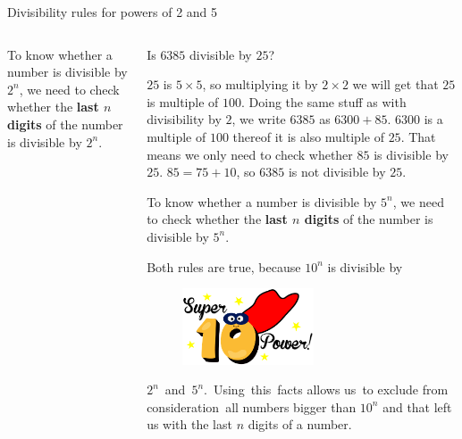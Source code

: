\documentclass[9pt,aspectratio=169]{beamer}
\begin{document}
\begin{frame}{Divisibility rules for powers of 2 and 5}
\begin{columns}[T]
\begin{column}{0.5\textwidth}
      \begin{definition}
        To know whether a number is divisible by $2^n$, we need to check whether the \textbf{last $n$ digits} of the number is divisible by $2^n$.
      \end{definition}
    \end{column}
    \begin{column}{0.5\textwidth}
      \begin{problem}
        Is $6385$ divisible by $25$?
      \end{problem}
      $25$ is $5 \times 5$, so multiplying it by $2 \times 2$ we will get that $25$ is multiple of $100$.
      Doing the same stuff as with divisibility by $2$, we write $6385$ as $6300 + 85$. $6300$ is a multiple of $100$ thereof it is also multiple of $25$. That means we only need to check whether $85$ is divisible by $25$. $85 = 75 + 10$, so $6385$ is not divisible by $25$.
      \begin{definition}
        To know whether a number is divisible by $5^n$, we need to check whether the \textbf{last $n$ digits} of the number is divisible by $5^n$.
      \end{definition}
      Both rules are true, because $10^n$ is divisible by
      \begin{figure}
        \vspace*{-0.8em}
        \hspace*{-1.5em}
        \includegraphics[width=0.55\textwidth]{01 - Modular arithmetic/10-power.png}
      \end{figure}
      $2^n$~and~$5^n$.~Using~this~facts allows us~to exclude from consideration~all numbers bigger than $10^n$ and that left us with the last $n$ digits of a number.
    \end{column}
  \end{columns}
\end{frame}
\end{document}
